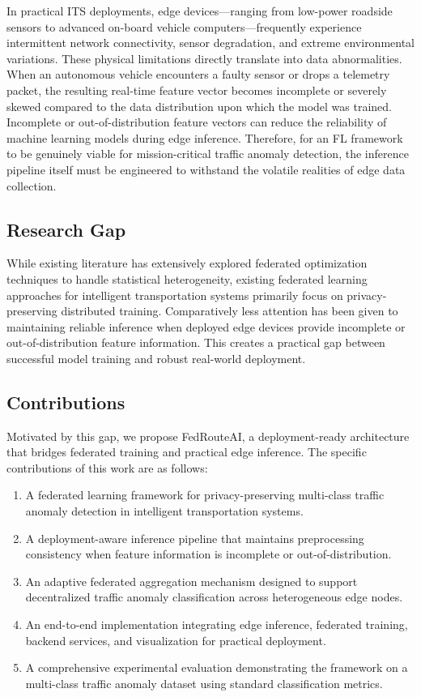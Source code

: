 In practical ITS deployments, edge devices---ranging from low-power roadside sensors to advanced on-board vehicle computers---frequently experience intermittent network connectivity, sensor degradation, and extreme environmental variations. These physical limitations directly translate into data abnormalities. When an autonomous vehicle encounters a faulty sensor or drops a telemetry packet, the resulting real-time feature vector becomes incomplete or severely skewed compared to the data distribution upon which the model was trained. Incomplete or out-of-distribution feature vectors can reduce the reliability of machine learning models during edge inference. Therefore, for an FL framework to be genuinely viable for mission-critical traffic anomaly detection, the inference pipeline itself must be engineered to withstand the volatile realities of edge data collection.

\subsection{Research Gap}

While existing literature has extensively explored federated optimization techniques to handle statistical heterogeneity, existing federated learning approaches for intelligent transportation systems primarily focus on privacy-preserving distributed training. Comparatively less attention has been given to maintaining reliable inference when deployed edge devices provide incomplete or out-of-distribution feature information. This creates a practical gap between successful model training and robust real-world deployment.

\subsection{Contributions}

Motivated by this gap, we propose FedRouteAI, a deployment-ready architecture that bridges federated training and practical edge inference. The specific contributions of this work are as follows:
\begin{enumerate}
    \item A federated learning framework for privacy-preserving multi-class traffic anomaly detection in intelligent transportation systems.
    \item A deployment-aware inference pipeline that maintains preprocessing consistency when feature information is incomplete or out-of-distribution.
    \item An adaptive federated aggregation mechanism designed to support decentralized traffic anomaly classification across heterogeneous edge nodes.
    \item An end-to-end implementation integrating edge inference, federated training, backend services, and visualization for practical deployment.
    \item A comprehensive experimental evaluation demonstrating the framework on a multi-class traffic anomaly dataset using standard classification metrics.
\end{enumerate}

